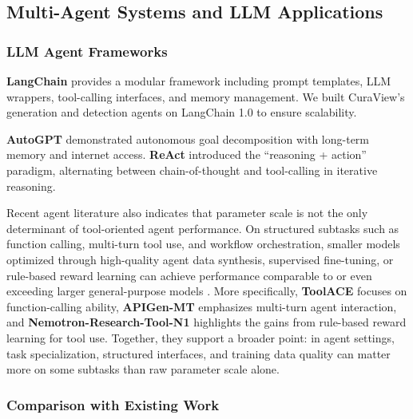 \documentclass[11pt]{article}
\begin{document}
\subsection{Multi-Agent Systems and LLM Applications}

\subsubsection{LLM Agent Frameworks}

\textbf{LangChain} \citep{chase2023langchain} provides a modular framework including prompt templates, LLM wrappers, tool-calling interfaces, and memory management. We built CuraView's generation and detection agents on LangChain 1.0 to ensure scalability.

\textbf{AutoGPT} \citep{significantgravitas2023autogpt} demonstrated autonomous goal decomposition with long-term memory and internet access. \textbf{ReAct} \citep{yao2023react} introduced the ``reasoning + action'' paradigm, alternating between chain-of-thought and tool-calling in iterative reasoning.

Recent agent literature also indicates that parameter scale is not the only determinant of tool-oriented agent performance. On structured subtasks such as function calling, multi-turn tool use, and workflow orchestration, smaller models optimized through high-quality agent data synthesis, supervised fine-tuning, or rule-based reward learning can achieve performance comparable to or even exceeding larger general-purpose models \citep{liu2025toolACE,prabhakar2025apiGenMt,zhang2025nemotronToolN1}. More specifically, \textbf{ToolACE} \citep{liu2025toolACE} focuses on function-calling ability, \textbf{APIGen-MT} \citep{prabhakar2025apiGenMt} emphasizes multi-turn agent interaction, and \textbf{Nemotron-Research-Tool-N1} \citep{zhang2025nemotronToolN1} highlights the gains from rule-based reward learning for tool use. Together, they support a broader point: in agent settings, task specialization, structured interfaces, and training data quality can matter more on some subtasks than raw parameter scale alone.

\subsubsection{Comparison with Existing Work}
\end{document}
